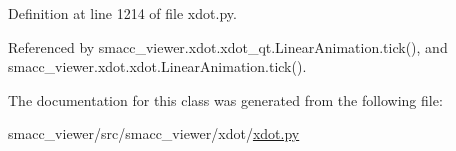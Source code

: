 Definition at line 1214 of file xdot.\+py.



Referenced by smacc\+\_\+viewer.\+xdot.\+xdot\+\_\+qt.\+Linear\+Animation.\+tick(), and smacc\+\_\+viewer.\+xdot.\+xdot.\+Linear\+Animation.\+tick().



The documentation for this class was generated from the following file\+:\begin{DoxyCompactItemize}
\item 
smacc\+\_\+viewer/src/smacc\+\_\+viewer/xdot/\hyperlink{xdot_8py}{xdot.\+py}\end{DoxyCompactItemize}
